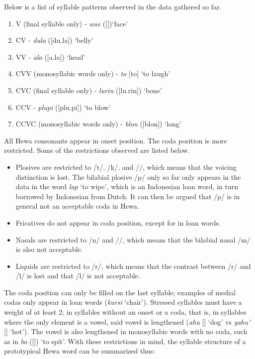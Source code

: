 \documentclass{article}
\begin{document}
Below is a list of syllable patterns observed in the data gathered so far.

\begin{enumerate}

\item V (final syllable only) - \textit{wae}  ([])`face'
\item CV - \textit{dula} ([du.la]) `belly'
\item VV - \textit{ala} ([a\textlengthmark .la]) `head'
\item CVV (monosyllabic words only) - \textit{to} [to\textlengthmark] `to laugh'
\item CVC (final syllable only) - \textit{lurin} ([lu.rin]) `bone' 
\item CCV - \textit{plupi} ([plu.pi]) `to blow'
\item CCVC (monosyllabic words only) - \textit{blon} ([blon]) `long'

\end{enumerate}

All Hewa consonants appear in onset position. The coda position is more restricted. Some of the restrictions observed are listed below.

\begin{itemize}

\item Plosives are restricted to /t/, /k/, and /\textglotstop /, which means that the voicing distinction is lost. The bilabial plosive /p/ only so far only appears in the data in the word \textit{lap} `to wipe', which is an Indonesian loan word, in turn borrowed by Indonesian from Dutch. It can then be argued that /p/ is in general not an acceptable coda in Hewa.

\item Fricatives do not appear in coda position, except for in loan words.

\item Nasals are restricted to /n/ and //, which means that the bilabial nasal /m/ is also not acceptable.

\item Liquids are restricted to /r/, which means that the contrast between /r/ and /l/ is lost and that /l/ is not acceptable.

\end{itemize}

The coda position can only be filled on the last syllable; examples of medial codas only appear in loan words (\textit{kursi} `chair'). Stressed syllables must have a weight of at least 2; in syllables without an onset or a coda, that is, in syllables where the only element is a vowel, said vowel is lengthened (\textit{ahu} [] `dog' vs \textit{gahu'} [] `hot'). The vowel is also lengthened in monosyllabic words with no coda, such as in  \textit{bo} ([]) `to spit'. With these restrictions in mind, the syllable structure of a prototypical Hewa word can be summarized thus:
\end{document}
